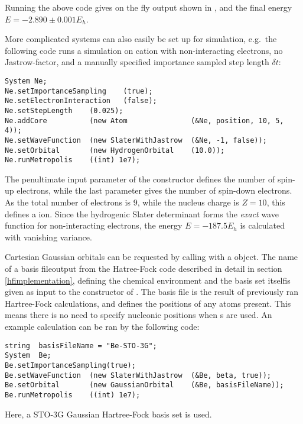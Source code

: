 \documentclass[../../master.tex]{subfiles}
\begin{document}
Running the above code gives on the fly output shown in , and the final energy $E=-2.890\pm0.001E_h$.

More complicated systems can also easily be set up for simulation, e.g.\ the following code runs a simulation on  cation with non-interacting electrons, no Jastrow-factor, and a manually specified importance sampled step length $\delta t$:
\begin{lstlisting}[language={[std]c++}]
System Ne;
Ne.setImportanceSampling    (true);
Ne.setElectronInteraction   (false);
Ne.setStepLength    (0.025);
Ne.addCore          (new Atom               (&Ne, position, 10, 5, 4));
Ne.setWaveFunction  (new SlaterWithJastrow  (&Ne, -1, false));
Ne.setOrbital       (new HydrogenOrbital    (10.0));
Ne.runMetropolis    ((int) 1e7);
\end{lstlisting}
The penultimate input parameter of the  constructor defines the number of spin-up electrons, while the last parameter gives the number of spin-down electrons. As the total number of electrons is $9$, while the nucleus charge is $Z=10$, this defines a  ion. Since the hydrogenic Slater determinant forms the \emph{exact} wave function for non-interacting electrons, the energy $E=-187.5E_h$ is calculated with vanishing variance. 

Cartesian Gaussian orbitals can be requested by calling  with a  object. The name of a basis file\textemdash output from the Hatree-Fock code described in detail in section \ref{hfimplementation}, defining the chemical environment and the basis set itself\textemdash is given as input to the constructor of . The basis file is the result of previously ran Hartree-Fock calculations, and defines the positions of any atoms present. This means there is no need to specify nucleonic positions when s are used. An example calculation can be ran by the following  code:
\begin{lstlisting}[language={[std]c++}]
string  basisFileName = "Be-STO-3G";
System  Be;
Be.setImportanceSampling(true);
Be.setWaveFunction  (new SlaterWithJastrow  (&Be, beta, true));
Be.setOrbital       (new GaussianOrbital    (&Be, basisFileName));
Be.runMetropolis    ((int) 1e7);
\end{lstlisting}
Here, a STO-3G Gaussian Hartree-Fock basis set is used. 

\renewcommand{\r}{{\bf r}}
\newcommand{\x}{{\bf x}}
\renewcommand{\R}{{\bf R}}
\newcommand{\Psit}{\Psi_\text{T}}
\newcommand{\pphi}{\tilde{\phi}}
\end{document}
